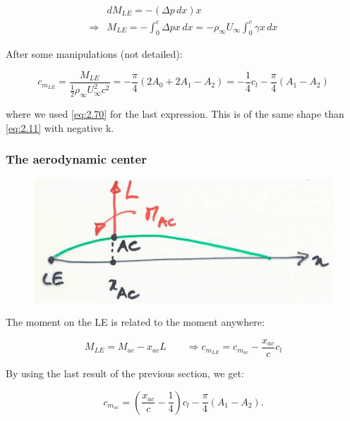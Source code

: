 	\begin{equation}
	\begin{aligned}
	&dM_{LE} = - (\Delta p \, dx) x \\ 
	\Rightarrow &M_{LE} = -\int _0 ^c \Delta p x \, dx = - \rho _\infty U_\infty \int _0^c \gamma x \, dx
	\end{aligned}
	\end{equation}
	
	After some manipulations (not detailed):
	
	\begin{equation}
	c_{m_{LE}} = \frac{M_{LE}}{\frac{1}{2}\rho _\infty U_\infty ^2 c^2} = - \frac{\pi}{4} (2A_0 + 2A_1 - A_2) = -\frac{1}{4} c_l - \frac{\pi}{4} (A_1 - A_2)
	\end{equation}
	
	where we used \eqref{eq:2.70} for the last expression. This is of the same shape than \eqref{eq:2.11} with negative k. 
	
\subsubsection{The aerodynamic center}
	\begin{figure}
	\vspace{-5mm}
	\includegraphics[scale=0.1]{ch2/35}
	\end{figure}
	The moment on the LE is related to the moment anywhere:
	
	\begin{equation}
	M_{LE} = M_{ac} - x_{ac} L \qquad \Rightarrow c_{m_{LE}} =c_{m_{ac}} - \frac{x_{ac}}{c}c_{l} 
	\end{equation}
	
	By using the last result of the previous section, we get: 
	
	\begin{equation}
	c_{m_{ac}} = \left( \frac{x_{ac}}{c} - \frac{1}{4} \right) c_l - \frac{\pi}{4} (A_1 -A_2).
	\end{equation}
	
